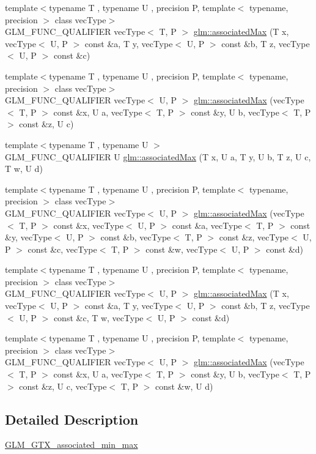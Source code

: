 \begin{DoxyCompactItemize}
\item 
{\footnotesize template$<$typename T , typename U , precision P, template$<$ typename, precision $>$ class vec\+Type$>$ }\\G\+L\+M\+\_\+\+F\+U\+N\+C\+\_\+\+Q\+U\+A\+L\+I\+F\+I\+ER vec\+Type$<$ T, P $>$ \hyperlink{group__gtx__associated__min__max_ga553431a468e251623408603bcb51c9cb}{glm\+::associated\+Max} (T x, vec\+Type$<$ U, P $>$ const \&a, T y, vec\+Type$<$ U, P $>$ const \&b, T z, vec\+Type$<$ U, P $>$ const \&c)
\item 
{\footnotesize template$<$typename T , typename U , precision P, template$<$ typename, precision $>$ class vec\+Type$>$ }\\G\+L\+M\+\_\+\+F\+U\+N\+C\+\_\+\+Q\+U\+A\+L\+I\+F\+I\+ER vec\+Type$<$ U, P $>$ \hyperlink{group__gtx__associated__min__max_ga327136e6a568569c03a056f90814b656}{glm\+::associated\+Max} (vec\+Type$<$ T, P $>$ const \&x, U a, vec\+Type$<$ T, P $>$ const \&y, U b, vec\+Type$<$ T, P $>$ const \&z, U c)
\item 
{\footnotesize template$<$typename T , typename U $>$ }\\G\+L\+M\+\_\+\+F\+U\+N\+C\+\_\+\+Q\+U\+A\+L\+I\+F\+I\+ER U \hyperlink{group__gtx__associated__min__max_ga3038ffcb43eaa6af75897a99a5047ccc}{glm\+::associated\+Max} (T x, U a, T y, U b, T z, U c, T w, U d)
\item 
{\footnotesize template$<$typename T , typename U , precision P, template$<$ typename, precision $>$ class vec\+Type$>$ }\\G\+L\+M\+\_\+\+F\+U\+N\+C\+\_\+\+Q\+U\+A\+L\+I\+F\+I\+ER vec\+Type$<$ U, P $>$ \hyperlink{group__gtx__associated__min__max_gaf607886421c35cd7e4f41a50d7c330e3}{glm\+::associated\+Max} (vec\+Type$<$ T, P $>$ const \&x, vec\+Type$<$ U, P $>$ const \&a, vec\+Type$<$ T, P $>$ const \&y, vec\+Type$<$ U, P $>$ const \&b, vec\+Type$<$ T, P $>$ const \&z, vec\+Type$<$ U, P $>$ const \&c, vec\+Type$<$ T, P $>$ const \&w, vec\+Type$<$ U, P $>$ const \&d)
\item 
{\footnotesize template$<$typename T , typename U , precision P, template$<$ typename, precision $>$ class vec\+Type$>$ }\\G\+L\+M\+\_\+\+F\+U\+N\+C\+\_\+\+Q\+U\+A\+L\+I\+F\+I\+ER vec\+Type$<$ U, P $>$ \hyperlink{group__gtx__associated__min__max_ga7a165de1af9a3f9193516a3b47407086}{glm\+::associated\+Max} (T x, vec\+Type$<$ U, P $>$ const \&a, T y, vec\+Type$<$ U, P $>$ const \&b, T z, vec\+Type$<$ U, P $>$ const \&c, T w, vec\+Type$<$ U, P $>$ const \&d)
\item 
{\footnotesize template$<$typename T , typename U , precision P, template$<$ typename, precision $>$ class vec\+Type$>$ }\\G\+L\+M\+\_\+\+F\+U\+N\+C\+\_\+\+Q\+U\+A\+L\+I\+F\+I\+ER vec\+Type$<$ U, P $>$ \hyperlink{group__gtx__associated__min__max_ga3122fbe8133ea54749b10fb93e8a167e}{glm\+::associated\+Max} (vec\+Type$<$ T, P $>$ const \&x, U a, vec\+Type$<$ T, P $>$ const \&y, U b, vec\+Type$<$ T, P $>$ const \&z, U c, vec\+Type$<$ T, P $>$ const \&w, U d)
\end{DoxyCompactItemize}


\subsection{Detailed Description}
\hyperlink{group__gtx__associated__min__max}{G\+L\+M\+\_\+\+G\+T\+X\+\_\+associated\+\_\+min\+\_\+max} 